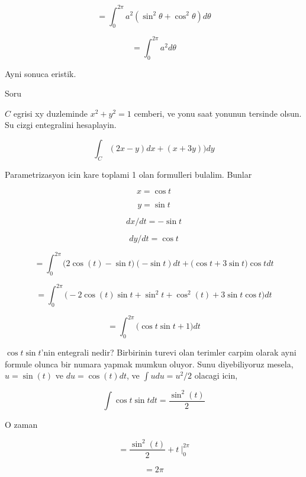 \documentclass[12pt,fleqn]{article}\usepackage{../common}
\begin{document}
\[ = \int_0^{2\pi} a^2 (\sin^2\theta + \cos^2\theta)d\theta \]

\[ = \int_0^{2\pi} a^2 d\theta \]

Ayni sonuca eristik. 

Soru 

$C$ egrisi xy duzleminde $x^2+y^2=1$ cemberi, ve yonu saat yonunun tersinde
olsun. Su cizgi entegralini hesaplayin.

\[ \int_C (2x-y)dx + (x+3y))dy \]

Parametrizasyon icin kare toplami 1 olan formulleri bulalim. Bunlar

\[ x = \cos t \]

\[ y = \sin t \]

\[ dx/dt = -\sin t\]

\[ dy/dt = \cos t \]

\[ =
\int_0^{2\pi} \bigg( 2\cos(t) - \sin t \bigg)(-\sin t )dt + 
\bigg(\cos t + 3\sin t \bigg) \cos t dt
 \]

\[ = 
\int_0^{2\pi} \bigg( 
-2\cos(t)\sin t + \sin^2 t + 
\cos^2(t) + 3 \sin t \cos t
\bigg) dt
 \]

\[ = 
\int_0^{2\pi} \bigg( 
\cos t \sin t + 1
\bigg) dt
 \]

$\cos t \sin t$'nin entegrali nedir? Birbirinin turevi olan terimler carpim
olarak ayni formule olunca bir numara yapmak mumkun oluyor. Sunu 
diyebiliyoruz mesela, $u=\sin(t)$ ve $du=\cos(t)dt$, ve $\int u du = u^2/2$
olacagi icin, 

\[ \int \cos t \sin t dt = \frac{\sin^2(t)}{2} \]

O zaman 

\[ = \frac{\sin^2(t)}{2} + t \ \bigg|_0^{2\pi}  \]

\[ =  2\pi \]
\end{document}

